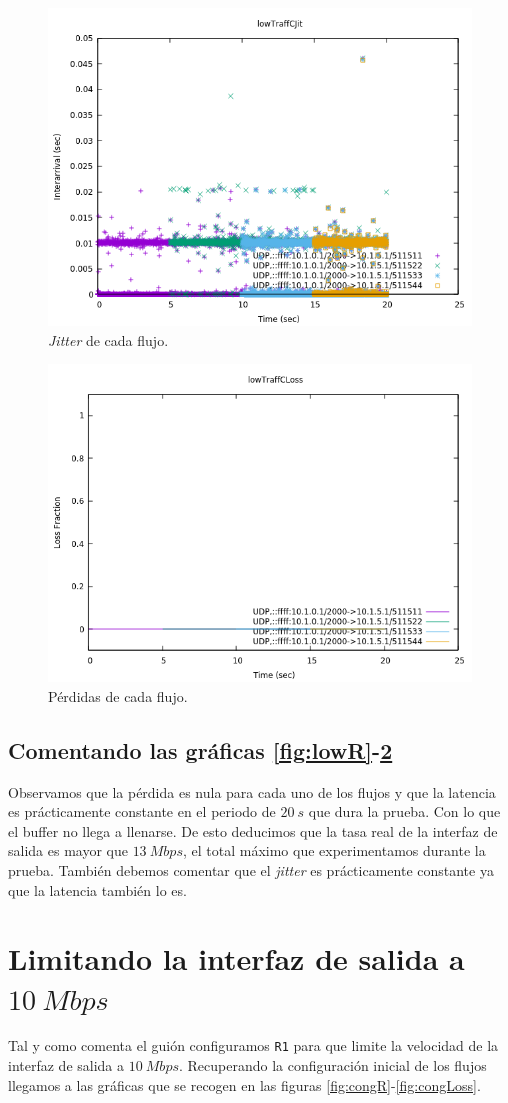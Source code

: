 \documentclass[11pt]{article}
\begin{document}
        \begin{figure}
            \centering
            \includegraphics[width=0.6\linewidth]{lowTraffJit.png}
            \caption{\textit{Jitter} de cada flujo.}
            \label{fig:lowJit}
        \end{figure}

        \begin{figure}
            \centering
            \includegraphics[width=0.6\linewidth]{lowTraffLoss.png}
            \caption{Pérdidas de cada flujo.}
            \label{fig:lowLoss}
        \end{figure}

        \subsection{Comentando las gráficas \ref{fig:lowR}-\ref{fig:lowLoss}}
            Observamos que la pérdida es nula para cada uno de los flujos y que la latencia es prácticamente constante en el periodo de $20\ s$ que dura la prueba. Con lo que el buffer no llega a llenarse. De esto deducimos que la tasa real de la interfaz de salida es mayor que $13\ Mbps$, el total máximo que experimentamos durante la prueba. También debemos comentar que el \textit{jitter} es prácticamente constante ya que la latencia también lo es.

    \section{Limitando la interfaz de salida a $10\ Mbps$}
        Tal y como comenta el guión configuramos \texttt{R1} para que limite la velocidad de la interfaz de salida a $10\ Mbps$. Recuperando la configuración inicial de los flujos llegamos a las gráficas que se recogen en las figuras \ref{fig:congR}-\ref{fig:congLoss}.
\end{document}
